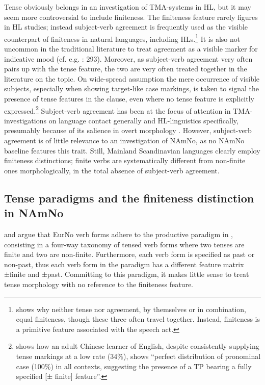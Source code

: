 \documentclass[output=paper]{langscibook}
\begin{document}
Tense obviously belongs in an investigation of TMA-systems in HL, but it may seem more controversial to include finiteness. The finiteness feature rarely figures in HL studies; instead subject-verb agreement is frequently used as the visible counterpart of finiteness in natural languages, including HLs.\footnote{\citet{Eide2016} shows why neither tense nor agreement, by themselves or in combination, equal finiteness, though these three often travel together. Instead, finiteness is a primitive feature associated with the speech act.} It is also not uncommon in the traditional literature to treat agreement as a visible marker for indicative mood (cf. e.g. \citealt{Amritavalli2014}: 293). Moreover, as subject-verb agreement very often pairs up with the tense feature, the two are very often treated together in the literature on the topic. On wide-spread assumption the mere occurrence of visible subjects, especially when showing target-like case markings, is taken to signal the presence of tense features in the clause, even where no tense feature is explicitly expressed.\footnote{\citet[1]{Lardiere1998} shows how an adult Chinese learner of English, despite consistently supplying tense markings at a low rate (34\%), shows “perfect distribution of pronominal case (100\%) in all contexts, suggesting the presence of a TP bearing a fully specified [± finite] feature”.}  Subject-verb agreement has been at the focus of attention in TMA-investigations on language contact generally and HL-linguistics specifically, presumably because of its salience in overt morphology \citep[62]{Montrul2016}. However, subject-verb agreement is of little relevance to an investigation of NAmNo, as no NAmNo baseline features this trait. Still, Mainland Scandinavian languages clearly employ finiteness distinctions; finite verbs are systematically different from non-finite ones morphologically, in the total absence of subject-verb agreement.

\subsection{Tense paradigms and the finiteness distinction in NAmNo}
\label{sec:eide:5.1}

\citet{Eide2002, Eide2005, Eide2009Finiteness, Eide2009Tense} and \citet{EideHjelde2015Verb, EideHjelde2023} argue that EurNo verb forms adhere to the productive paradigm in , consisting in a four-way taxonomy of tensed verb forms where two tenses are finite and two are non-finite. Furthermore, each verb form is specified as past or non-past, thus each verb form in the paradigm has a different feature matrix ±finite and ±past. Committing to this paradigm, it makes little sense to treat tense morphology with no reference to the finiteness feature.
\end{document}
